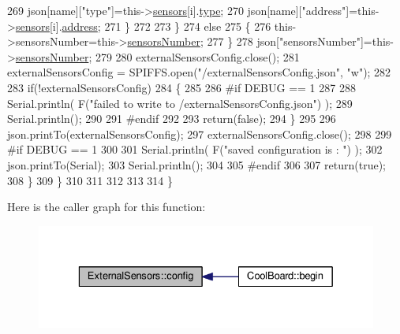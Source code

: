 \begin{DoxyCode}
269                     json[name][\textcolor{stringliteral}{"type"}]=this->\hyperlink{classExternalSensors_a284233f884fcf00154a44740cf1d9e1e}{sensors}[i].\hyperlink{structExternalSensors_1_1sensor_a6acfdb02c742c2110d7bd2b5d9fce9e7}{type};
270                     json[name][\textcolor{stringliteral}{"address"}]=this->\hyperlink{classExternalSensors_a284233f884fcf00154a44740cf1d9e1e}{sensors}[i].\hyperlink{structExternalSensors_1_1sensor_a8d70ca58524521ed054fc6b81eb58d34}{address};
271                 \}
272  
273             \}
274             \textcolor{keywordflow}{else}
275             \{
276                 this->sensorsNumber=this->\hyperlink{classExternalSensors_a58e4fbf9adeae787d92be5fa33043b5d}{sensorsNumber};
277             \}
278             json[\textcolor{stringliteral}{"sensorsNumber"}]=this->\hyperlink{classExternalSensors_a58e4fbf9adeae787d92be5fa33043b5d}{sensorsNumber};
279 
280             externalSensorsConfig.close();
281             externalSensorsConfig = SPIFFS.open(\textcolor{stringliteral}{"/externalSensorsConfig.json"}, \textcolor{stringliteral}{"w"});
282 
283             \textcolor{keywordflow}{if}(!externalSensorsConfig)
284             \{
285             
286 \textcolor{preprocessor}{            #if DEBUG == 1 }
287 
288                 Serial.println( F(\textcolor{stringliteral}{"failed to write to /externalSensorsConfig.json"}) );
289                 Serial.println();
290             
291 \textcolor{preprocessor}{            #endif}
292 
293                 \textcolor{keywordflow}{return}(\textcolor{keyword}{false});
294             \}
295             
296             json.printTo(externalSensorsConfig);
297             externalSensorsConfig.close();
298             
299 \textcolor{preprocessor}{        #if DEBUG == 1 }
300 
301             Serial.println( F(\textcolor{stringliteral}{"saved configuration is : "}) );
302             json.printTo(Serial);
303             Serial.println();
304         
305 \textcolor{preprocessor}{        #endif}
306 
307             \textcolor{keywordflow}{return}(\textcolor{keyword}{true}); 
308         \}
309     \}   
310     
311 
312 
313 
314 \}
\end{DoxyCode}
Here is the caller graph for this function\+:
\nopagebreak
\begin{figure}[H]
\begin{center}
\leavevmode
\includegraphics[width=329pt]{classExternalSensors_a862a4bd11346b37270d0244c2adabe5a_icgraph}
\end{center}
\end{figure}
\mbox{\label{classExternalSensors_a78c2bf55084435dd51d3c559b2d3c6f3}} 

